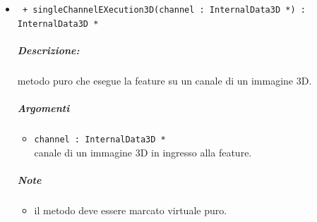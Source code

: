\begin{itemize}
	\item \color{blue}\verb! + singleChannelEXecution3D(channel : InternalData3D *) : InternalData3D *!
		\color{black}
		\subparagraph{Descrizione:} metodo puro che esegue la feature su un canale di un immagine 3D.
		\subparagraph{Argomenti}
			\begin{itemize}
				\item \color{RoyalPurple} \verb!channel : InternalData3D * ! \\ 
				\color{black} canale di un immagine 3D in ingresso alla feature.		
			\end{itemize}
		\subparagraph{Note}
			\begin{itemize}
				\item il metodo deve essere marcato virtuale puro.
			\end{itemize}
			
	\end{itemize}
\color{black}